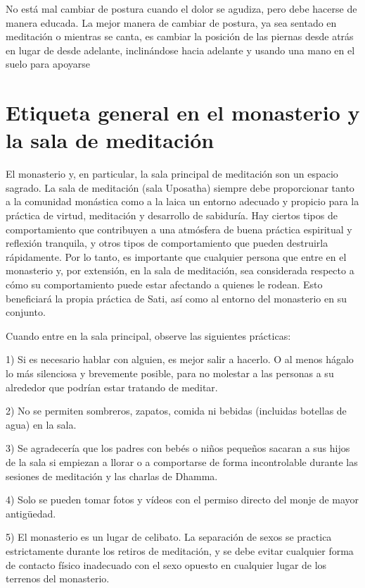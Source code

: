 No está mal cambiar de postura cuando el dolor se agudiza, pero debe hacerse de manera educada. La mejor manera de cambiar de postura, ya sea sentado en meditación o mientras se canta, es cambiar la posición de las piernas desde atrás en lugar de desde adelante, inclinándose hacia adelante y usando una mano en el suelo para apoyarse

\section{Etiqueta general en el monasterio y la sala de meditación}

El monasterio y, en particular, la sala principal de meditación son un espacio sagrado. La sala de meditación (sala Uposatha) siempre debe proporcionar tanto a la comunidad monástica como a la laica un entorno adecuado y propicio para la práctica de virtud, meditación y desarrollo de sabiduría. Hay ciertos tipos de comportamiento que contribuyen a una atmósfera de buena práctica espiritual y reflexión tranquila, y otros tipos de comportamiento que pueden destruirla rápidamente. Por lo tanto, es importante que cualquier persona que entre en el monasterio y, por extensión, en la sala de meditación, sea considerada respecto a cómo su comportamiento puede estar afectando a quienes le rodean. Esto beneficiará la propia práctica de Sati, así como al entorno del monasterio en su conjunto.

Cuando entre en la sala principal, observe las siguientes prácticas:

1) Si es necesario hablar con alguien, es mejor salir a hacerlo. O al menos hágalo lo más silenciosa y brevemente posible, para no molestar a las personas a su alrededor que podrían estar tratando de meditar.

2) No se permiten sombreros, zapatos, comida ni bebidas (incluidas botellas de agua) en la sala.

3) Se agradecería que los padres con bebés o niños pequeños sacaran a sus hijos de la sala si empiezan a llorar o a comportarse de forma incontrolable durante las sesiones de meditación y las charlas de Dhamma.

4) Solo se pueden tomar fotos y vídeos con el permiso directo del monje de mayor antigüedad.

5) El monasterio es un lugar de celibato. La separación de sexos se practica estrictamente durante los retiros de meditación, y se debe evitar cualquier forma de contacto físico inadecuado con el sexo opuesto en cualquier lugar de los terrenos del monasterio.

